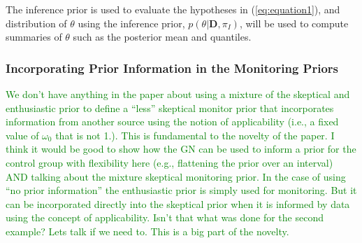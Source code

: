 \documentclass[12pt]{article}
\begin{document}
The inference prior is used to evaluate the hypotheses in (\ref{eq:equation1}), and distribution of $\theta$ using the inference 
prior, $p(\theta|\mathbf{D},\pi_I)$, will be used to compute summaries of $\theta$ such as the posterior mean and quantiles.

%

\subsubsection{Incorporating Prior Information in the Monitoring Priors}

\textcolor{green}{We don't have anything in the paper about using a mixture of the skeptical and enthusiastic prior to 
define a ``less'' skeptical monitor prior that incorporates information from another source using the 
notion of applicability (i.e., a fixed value of $\omega_0$ that is not 1.). 
%
This is fundamental to the novelty of the paper. 
%
I think it would be good to show how the GN can be used to inform a prior for the control group with flexibility here (e.g., flattening the prior over an interval)
AND talking about the mixture skeptical monitoring prior.
%
In the case of using ``no prior information'' the enthusiastic prior is simply used for monitoring. But it can be incorporated directly into the 
skeptical prior when it is informed by data using the concept of applicability.
%
Isn't that what was done for the second example? Lets talk if we need to. This is a big part of the novelty.
}
\end{document}
